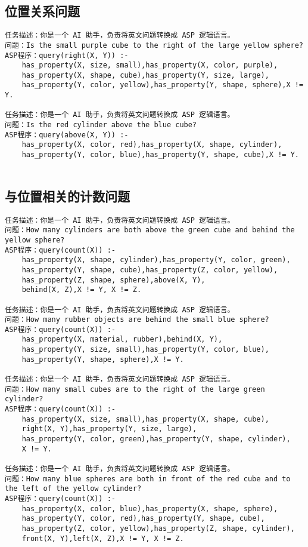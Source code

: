 \subsection{位置关系问题}
\begin{lstlisting}
任务描述：你是一个 AI 助手，负责将英文问题转换成 ASP 逻辑语言。
问题：Is the small purple cube to the right of the large yellow sphere?
ASP程序：query(right(X, Y)) :-
    has_property(X, size, small),has_property(X, color, purple),
    has_property(X, shape, cube),has_property(Y, size, large),
    has_property(Y, color, yellow),has_property(Y, shape, sphere),X != Y.

任务描述：你是一个 AI 助手，负责将英文问题转换成 ASP 逻辑语言。 
问题：Is the red cylinder above the blue cube?
ASP程序：query(above(X, Y)) :-
    has_property(X, color, red),has_property(X, shape, cylinder),
    has_property(Y, color, blue),has_property(Y, shape, cube),X != Y.


\end{lstlisting}
\subsection{与位置相关的计数问题}
\begin{lstlisting}
任务描述：你是一个 AI 助手，负责将英文问题转换成 ASP 逻辑语言。
问题：How many cylinders are both above the green cube and behind the yellow sphere?
ASP程序：query(count(X)) :-
    has_property(X, shape, cylinder),has_property(Y, color, green),
    has_property(Y, shape, cube),has_property(Z, color, yellow),
    has_property(Z, shape, sphere),above(X, Y),
    behind(X, Z),X != Y, X != Z.

任务描述：你是一个 AI 助手，负责将英文问题转换成 ASP 逻辑语言。
问题：How many rubber objects are behind the small blue sphere?
ASP程序：query(count(X)) :-
    has_property(X, material, rubber),behind(X, Y),
    has_property(Y, size, small),has_property(Y, color, blue),
    has_property(Y, shape, sphere),X != Y.

任务描述：你是一个 AI 助手，负责将英文问题转换成 ASP 逻辑语言。
问题：How many small cubes are to the right of the large green cylinder?
ASP程序：query(count(X)) :-
    has_property(X, size, small),has_property(X, shape, cube),
    right(X, Y),has_property(Y, size, large),
    has_property(Y, color, green),has_property(Y, shape, cylinder),
    X != Y.

任务描述：你是一个 AI 助手，负责将英文问题转换成 ASP 逻辑语言。
问题：How many blue spheres are both in front of the red cube and to the left of the yellow cylinder?
ASP程序：query(count(X)) :-
    has_property(X, color, blue),has_property(X, shape, sphere),
    has_property(Y, color, red),has_property(Y, shape, cube),
    has_property(Z, color, yellow),has_property(Z, shape, cylinder),
    front(X, Y),left(X, Z),X != Y, X != Z.
\end{lstlisting}
